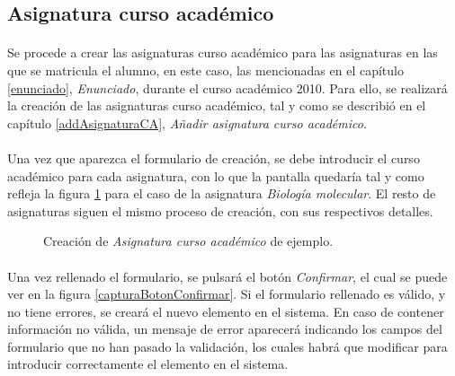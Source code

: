 \subsection{Asignatura curso académico}

  \paragraph{}Se procede a crear las asignaturas curso académico para las
  asignaturas en las que se matricula el alumno,
  en este caso, las mencionadas en el capítulo \ref{enunciado},
  \textit{Enunciado}, durante el curso académico 2010. Para ello, se realizará
  la creación de las asignaturas curso académico, tal y como se describió en el
  capítulo \ref{addAsignaturaCA}, \textit{Añadir asignatura curso académico}.

  \paragraph{}Una vez que aparezca el formulario de creación, se debe introducir
  el curso académico para cada asignatura, con lo que la pantalla quedaría tal
  y como refleja la figura \ref{ejemploAddAsignaturaCA} para el caso de la
  asignatura \textit{Biología molecular}. El resto de asignaturas siguen el
  mismo proceso de creación, con sus respectivos detalles.

  \begin{figure}[!ht]
    \begin{center}
      \caption{Creación de \textit{Asignatura curso académico} de ejemplo.}
      \label{ejemploAddAsignaturaCA}
    \end{center}
  \end{figure}

  \paragraph{}Una vez rellenado el formulario, se pulsará el botón
  \textit{Confirmar}, el cual se puede ver en la figura
  \ref{capturaBotonConfirmar}. Si el formulario rellenado es válido, y no tiene
  errores, se creará el nuevo elemento en el sistema. En caso de contener
  información no válida, un mensaje de error aparecerá indicando los campos
  del formulario que no han pasado la validación, los cuales habrá que modificar
  para introducir correctamente el elemento en el sistema.
